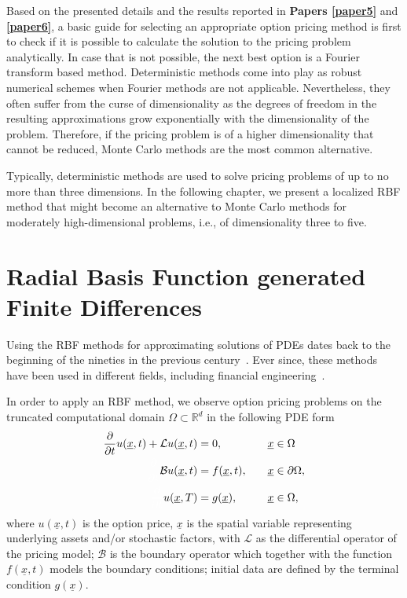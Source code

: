 \documentclass{UUThesisTemplate}
\begin{document}
\par
Based on the presented details and the results reported in \textbf{Papers \ref{paper5}} and \textbf{\ref{paper6}}, a basic guide for selecting an appropriate option pricing method is first to check if it is possible to calculate the solution to the pricing problem analytically. In case that is not possible, the next best option is a Fourier transform based method. Deterministic methods come into play as robust numerical schemes when Fourier methods are not applicable. Nevertheless, they often suffer from the curse of dimensionality as the degrees of freedom in the resulting approximations grow exponentially with the dimensionality of the problem. Therefore, if the pricing problem is of a higher dimensionality that cannot be reduced, Monte Carlo methods are the most common alternative.

\par
Typically, deterministic methods are used to solve pricing problems of up to no more than three dimensions. In the following chapter, we present a localized RBF method that might become an alternative to Monte Carlo methods for moderately high-dimensional problems, i.e., of dimensionality three to five. 
%
%





%
\chapter{Radial Basis Function generated Finite Differences}
\label{ch:rbffd}

\par
Using the RBF methods for approximating solutions of PDEs dates back to the beginning of the nineties in the previous century~\cite{kansa1990multiquadrics1,kansa1990multiquadrics2}. Ever since, these methods have been used in different fields, including financial engineering~\cite{hon1999radial, fasshauer2004using,pettersson2008improved}. 

\par
In order to apply an RBF method, we observe option pricing problems on the truncated computational domain $\Omega\subset \mathbb{R}^{d}$ in the following PDE form
\begin{alignat}{2}
\frac{\partial}{\partial t}u(\underline{x},t) + \mathcal{L}u(\underline{x},t) &= 0, \quad &&\underline{x} \in \Omega \label{eqPDE} \\
{\color{white} \frac{\partial}{\partial t}} \mathcal{B}u(\underline{x},t) &= f(\underline{x},t), \quad &&\underline{x} \in \partial \Omega, \label{eqBC} \\
{\color{white} \frac{\partial}{\partial t}} u(\underline{x},T) &= g(\underline{x}), \quad &&\underline{x} \in \Omega, \label{eqTC}
\end{alignat}
where $u(\underline{x},t)$ is the option price, $\underline{x}$ is the spatial variable representing underlying assets and/or stochastic factors, with $\mathcal{L}$ as the differential operator of the pricing model; $\mathcal{B}$ is the boundary operator which together with the function $f(\underline{x},t)$ models the boundary conditions; initial data are defined by the terminal condition $g(\underline{x})$. 
\end{document}
